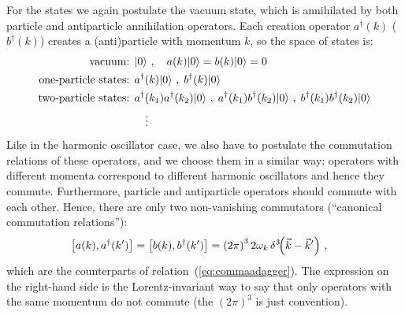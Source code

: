 \documentclass[12pt]{report}
\newcommand{\ket}[1]{\ensuremath{\!\left| #1 \right\rangle}}
\newcommand{\2}{\ensuremath{\sqrt{2}\,}}
\begin{document}
      For the states we again postulate the vacuum state, which is annihilated by both particle
      and antiparticle annihilation operators. Each creation operator $a^\dagger(k)$
      ($b^\dagger(k)$) creates a (anti)particle with momentum $k$, so the space of states is:
      \begin{align*}\index{Hilbert space!of the scalar field}  
        \text{vacuum: }&\ket{0}\,,\quad a(k)\ket{0}=b(k)\ket{0}=0\\
        \text{one-particle states: }&a^\dagger(k)\ket{0}\,,\;b^\dagger(k)\ket{0} \\
        \text{two-particle states: } &a^\dagger(k_1)a^\dagger(k_2)\ket{0}\,,\;
        a^\dagger(k_1)b^\dagger(k_2)\ket{0}\,,\;
        b^\dagger(k_1)b^\dagger(k_2)\ket{0}  \\
        &\quad\vdots
      \end{align*}
      Like in the harmonic oscillator case, we
      also have to postulate the commutation relations of these operators, and we choose them in a
      similar way: operators with different momenta correspond to different harmonic oscillators and
      hence they commute. Furthermore, particle and antiparticle operators should commute with each
      other.  Hence, there are only two non-vanishing commutators (``canonical commutation relations''):
      \begin{align}\label{relcom}\index{Canonical commutation relations!for creation and annihilation operators}
        \left[ a(k),a^\dagger(k')\right]&=\left[ b(k),b^\dagger(k')\right] = \left(2\pi\right)^3 2
      \omega_k \,\delta^3\!\!\left(\vec{k}-\vec{k}'\right) \,,
      \end{align}
      which are the counterparts of relation~(\ref{eq:commaadagger}). The expression on the right-hand
      side is the Lorentz-invariant way to say that only operators with the same momentum do not
      commute (the $(2\pi)^3$ is just convention).
      
\end{document}
